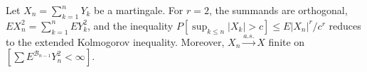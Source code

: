 Let $X_n = \sum_{k=1}^{n} Y_k$ be a martingale. For $r = 2$, the summands are orthogonal, $EX_n^2 = \sum_{k=1}^{n} EY_k^2$, and the inequality $P[\sup_{k \leq n} |X_k| > c] \leq E|X_n|^r/c^r$ reduces to the extended Kolmogorov inequality. Moreover, $X_n \xrightarrow{a.s.} X$ finite on $[\sum E^{\mathcal{B}_{n-1}}Y_n^2 < \infty]$.
